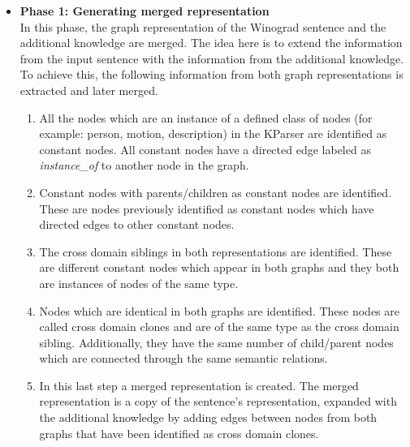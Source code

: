 \begin{itemize}
	\item \textbf{Phase 1: Generating merged representation}\\
	 In this phase, the graph representation of the Winograd sentence and the additional knowledge are merged. The idea here is to extend the information from the input sentence with the information from the additional knowledge. To achieve this, the following information from both graph representations is extracted and later merged.
	\begin{enumerate}
		\item All the nodes which are an instance of a defined class of nodes (for example: person, motion, description) in the KParser are identified as constant nodes. All constant nodes have a directed edge labeled as \textit{instance\_of} to another node in the graph. 
		\item Constant nodes with parents/children as constant nodes are identified. These are nodes previously identified as constant nodes which have directed edges to other constant nodes.
		\item The cross domain siblings in both representations are identified. These are different constant nodes which appear in both graphs and they both are instances of nodes of the same type. 
		\item Nodes which are identical in both graphs are identified. These nodes are called cross domain clones and are of the same type as the cross domain sibling. Additionally, they have the same number of child/parent nodes which are connected through the same semantic relations. 
		\item In this last step a merged representation is created. The merged representation is a copy of the sentence's representation, expanded with the additional knowledge by adding edges between nodes from both graphs that have been identified as cross domain clones.
	\end{enumerate}


\end{itemize}
